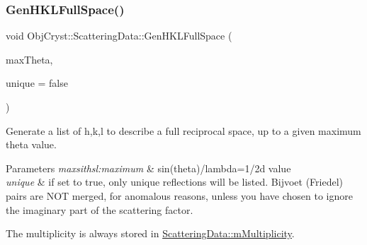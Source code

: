 \subsubsection{\texorpdfstring{GenHKLFullSpace()}{GenHKLFullSpace()}}
{\footnotesize\ttfamily void Obj\+Cryst\+::\+Scattering\+Data\+::\+Gen\+H\+K\+L\+Full\+Space (\begin{DoxyParamCaption}\item[{const R\+E\+AL}]{max\+Theta,  }\item[{const bool}]{unique = {\ttfamily false} }\end{DoxyParamCaption})\hspace{0.3cm}{\ttfamily [virtual]}}



Generate a list of h,k,l to describe a full reciprocal space, up to a given maximum theta value. 


\begin{DoxyParams}{Parameters}
{\em maxsithsl\+:maximum} & sin(theta)/lambda=1/2d value \\
\hline
{\em unique} & if set to true, only unique reflections will be listed. Bijvoet (Friedel) pairs are N\+OT merged, for \textquotesingle{}anomalous\textquotesingle{} reasons, unless you have chosen to ignore the imaginary part of the scattering factor.\\
\hline
\end{DoxyParams}
The multiplicity is always stored in \mbox{\hyperlink{class_obj_cryst_1_1_scattering_data_affaae453ef7ac110ab7a1f0abb2c50a7}{Scattering\+Data\+::m\+Multiplicity}}.

